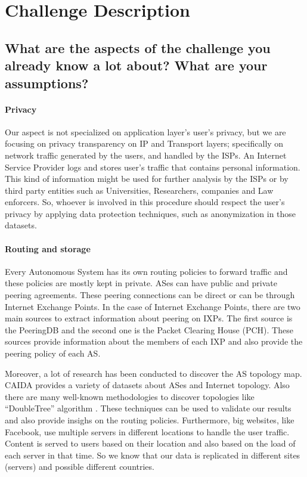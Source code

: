 \section{Challenge Description}
\label{sec_a}

\subsection{What are the aspects of the challenge you already know a lot about?
What are your assumptions?}

\paragraph{Privacy}

Our aspect is not specialized  on application layer's  user's privacy,  
but we are focusing on privacy transparency on IP and Transport layers; 
specifically on  network traffic generated by the users, and  handled by the ISPs.
An Internet Service Provider logs and stores user's traffic that contains 
personal information. 
This kind of information might be used for further analysis by the ISPs or by 
third party entities such as Universities, Researchers, companies and Law enforcers.	
So, whoever is involved in this procedure should respect the user's privacy by 
applying data protection techniques, such as anonymization in those datasets.

\paragraph{Routing and storage}

Every Autonomous System has its own routing policies to forward traffic and these 
policies are mostly kept in private. ASes can have public and private peering 
agreements. These peering connections can be direct or can be through Internet 
Exchange Points. In the case of Internet Exchange Points, there are two main 
sources to extract information about peering on IXPs. The first source is the 
PeeringDB and the second one is the Packet Clearing House (PCH). 
These sources provide information about the members of each IXP and also provide
the peering policy of each AS. 

Moreover, a lot of research has been conducted to discover the AS topology map. 
CAIDA provides a variety of datasets about ASes and Internet topology. Also there 
are many well-known methodologies to discover topologies like ``DoubleTree'' algorithm 
\cite{caida}. 
These techniques can be used  to validate our results and also provide insighs 
on the routing policies.
Furthermore, big websites, like Facebook, use multiple servers in different locations 
to handle the user traffic. Content is served to users based on their location and 
also based on the load of each server in that time. So we know that our data is 
replicated in different sites (servers) and possible different countries. 

